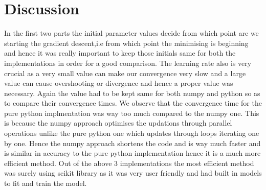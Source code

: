 \documentclass[12pt]{article}
\begin{document}
\section{Discussion}
In the first two parts the initial parameter values decide from which point are we starting the gradient descent,i.e from which point the minimising is beginning and hence it was really important to keep those initials same for both the implementations in order for a good comparison.
The learning rate also is very crucial as a very small value can make our convergence very slow and a large value can cause overshooting or divergence and hence a proper value was necessary. Again the value had to be kept same for both numpy and python so as to compare their convergence times.
We observe that the convergence time for the pure python implmentation was way too much compared to the numpy one. This is because the numpy approach optimises the updations through parallel operations unlike the pure python one which updates through loops iterating one by one.
Hence the numpy approach shortens the code and is way much faster and is similar in accuracy to the pure python implementation hence it is a much more efficient method.
Out of the above 3 implementations the most efficient method was surely using scikit library as it was very user friendly and had built in models to fit and train the model.
\end{document}
